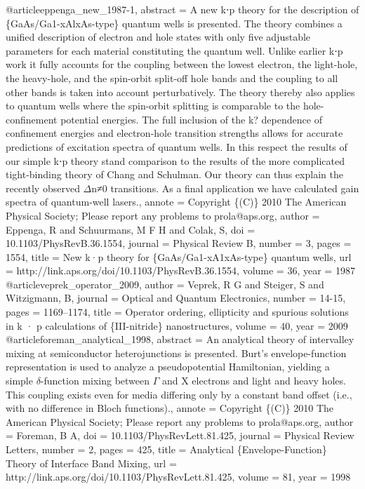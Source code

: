 @article{eppenga_new_1987-1,
abstract = {A new k⋅p theory for the description of \{GaAs/Ga1-xAlxAs-type\} quantum wells is presented. The theory combines a unified description of electron and hole states with only five adjustable parameters for each material constituting the quantum well. Unlike earlier k⋅p work it fully accounts for the coupling between the lowest electron, the light-hole, the heavy-hole, and the spin-orbit split-off hole bands and the coupling to all other bands is taken into account perturbatively. The theory thereby also applies to quantum wells where the spin-orbit splitting is comparable to the hole-confinement potential energies. The full inclusion of the k? dependence of confinement energies and electron-hole transition strengths allows for accurate predictions of excitation spectra of quantum wells. In this respect the results of our simple k⋅p theory stand comparison to the results of the more complicated tight-binding theory of Chang and Schulman. Our theory can thus explain the recently observed $\Delta$n≠0 transitions. As a final application we have calculated gain spectra of quantum-well lasers.},
annote = {Copyright \{(C)\} 2010 The American Physical Society; Please report any problems to prola@aps.org},
author = {Eppenga, R and Schuurmans, M F H and Colak, S},
doi = {10.1103/PhysRevB.36.1554},
journal = {Physical Review B},
number = {3},
pages = {1554},
title = {{New k·p theory for \{GaAs/Ga1-xA1xAs-type\} quantum wells}},
url = {http://link.aps.org/doi/10.1103/PhysRevB.36.1554},
volume = {36},
year = {1987}
}
@article{veprek_operator_2009,
author = {Veprek, R G and Steiger, S and Witzigmann, B},
journal = {Optical and Quantum Electronics},
number = {14-15},
pages = {1169--1174},
title = {{Operator ordering, ellipticity and spurious solutions in k · p calculations of \{III-nitride\} nanostructures}},
volume = {40},
year = {2009}
}
@article{foreman_analytical_1998,
abstract = {An analytical theory of intervalley mixing at semiconductor heterojunctions is presented. Burt's envelope-function representation is used to analyze a pseudopotential Hamiltonian, yielding a simple $\delta$-function mixing between $\Gamma$ and X electrons and light and heavy holes. This coupling exists even for media differing only by a constant band offset (i.e., with no difference in Bloch functions).},
annote = {Copyright \{(C)\} 2010 The American Physical Society; Please report any problems to prola@aps.org},
author = {Foreman, B A},
doi = {10.1103/PhysRevLett.81.425},
journal = {Physical Review Letters},
number = {2},
pages = {425},
title = {{Analytical \{Envelope-Function\} Theory of Interface Band Mixing}},
url = {http://link.aps.org/doi/10.1103/PhysRevLett.81.425},
volume = {81},
year = {1998}
}
